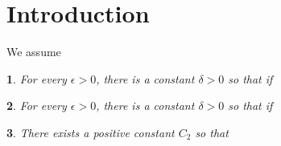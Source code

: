 \documentclass{amsart}
\theoremstyle{plain}
\newtheorem{thm}{\protect\theoremname}[section]
\newtheorem{cor}[thm]{\protect\corollaryname}
\begin{document}
\section{Introduction}

We assume 

\begin{thm}
For every $\epsilon>0$, there is a constant $\delta>0$ so that if
\end{thm}

\begin{cor}
For every $\epsilon>0$, there is a constant $\delta>0$ so that if
\end{cor}

\begin{thm}
There exists a positive constant $C_2$ so that
\end{thm}
\end{document}
